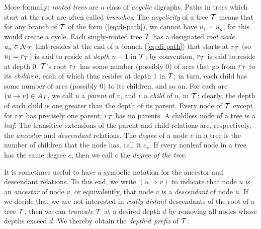 More formally: {\em rooted trees} are a class of {\em acyclic}
digraphs.  Paths in trees which start at the root are often called
{\em branches}.  The {\em acyclicity} of a tree $\mbox{$\cal T$}$ means that for
any branch of $\mbox{$\cal T$}$ of the form (\ref{eq:di-path}), we cannot have $u_1 =
u_n$, for this would create a cycle.  Each singly-rooted tree $\mbox{$\cal T$}$ has
a designated {\em root node}  $u_n \in
\mbox{$\cal N$}_{\mbox{{\scriptsize $\cal T$}}}$ that resides at the end of a branch (\ref{eq:di-path}) that
starts at $r_{\mbox{{\scriptsize $\cal T$}}}$ (so $u_1 = r_{\mbox{{\scriptsize $\cal T$}}}$) is said to reside at {\em
  depth} $n-1$ in $\mbox{$\cal T$}$; by convention, $r_{\mbox{{\scriptsize $\cal T$}}}$ is said to reside at
depth $0$.   $\mbox{$\cal T$}$'s
root $r_{\mbox{{\scriptsize $\cal T$}}}$ has some number (possibly $0$) of arcs that go from
$r_{\mbox{{\scriptsize $\cal T$}}}$ to its {\em children,} each of which thus resides at depth
$1$ in $\mbox{$\cal T$}$; in turn, each child has some number of arcs (possibly
$0$) to its children, and so on.  For each arc $(u \rightarrow v) \in
A_{\mbox{{\scriptsize $\cal T$}}}$, we call $u$ a {\it parent}  of $v$,
and $v$ a {\it child}  of $u$, in $\mbox{$\cal T$}$;
clearly, the depth of each child is one greater than the depth of its
parent.  Every node of $\mbox{$\cal T$}$ except for $r_{\mbox{{\scriptsize $\cal T$}}}$ has precisely one
parent; $r_{\mbox{{\scriptsize $\cal T$}}}$ has no parents.  A childless node of a tree is a
{\em leaf}.   The transitive extensions of the
parent and child relations are, respectively, the {\em ancestor}
 and {\em descendant}
 relations.  The {\em degree}
 of a node $v$ in a tree is the
number of children that the node has, call it $c_v$.  If every nonleaf
node in a tree has the same degree $c$, then we call $c$ the {\em
  degree of the tree}.

It is sometimes useful to have a symbolic notation for the ancestor
and descendant relations.  To this end, we write $(u \Rightarrow v)$
 to
indicate that node $u$ is an {\it ancestor} of node $v$, or
equivalently, that node $v$ is a {\it descendant} of node $u$.  If we
decide that we are not interested in {\em really distant} descendants
of the root of a tree $\mbox{$\cal T$}$, then we can {\em truncate} 
$\mbox{$\cal T$}$ at a desired depth $d$ by removing all nodes whose depths exceed
$d$.  We thereby obtain the {\em depth-$d$ prefix} of $\mbox{$\cal T$}$.

